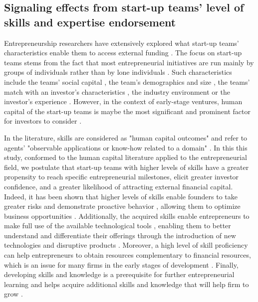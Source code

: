 \documentclass[12pt]{article}
\begin{document}
\subsection{Signaling effects from start-up teams' level of skills and expertise endorsement}

Entrepreneurship researchers have extensively explored what start-up teams' characteristics enable them to access external funding \citep{roure1990predictors}. The focus on start-up teams stems from the fact that most entrepreneurial initiatives are run mainly by groups of individuals rather than by lone individuals \citep{klotz2014new}. Such characteristics include the teams' social capital \citep{shane2002network}, the team's demographics and size \citep{eisenhardt1990organizational}, the teams' match with an investor's characteristics \citep{aggarwal2015evaluating}, the industry environment \citep{townsend2015turning} or the investor's experience \citep{franke2008venture}. However, in the context of early-stage ventures, human capital of the start-up teams is maybe the most significant and prominent factor for investors to consider \citep{beckman2007early, ko2018signaling, matusik2008values}.

In the literature, skills are considered as "human capital outcomes" and refer to agents’ "observable applications or know-how related to a domain" \citep{becker1964human, marvel2016human}. In this this study, conformed to the human capital literature applied to the entrepreneurial field, we postulate that start-up teams with higher levels of skills have a greater propensity to reach specific entrepreneurial milestones, elicit greater investor confidence, and a greater likelihood of attracting external financial capital. Indeed, it has been shown that higher levels of skills enable founders to take greater risks and demonstrate proactive behavior \citep{becherer1999proactive}, allowing them to optimize business opportunities \citep{shane2000promise, chandler1994founder}. Additionally, the acquired skills enable entrepreneurs to make full use of the available technological tools \citep{nambisan2017digital}, enabling them to better understand and differentiate their offerings through the introduction of new technologies and disruptive products \citep{marvel2007technology}. Moreover, a high level of skill proficiency can help entrepreneurs to obtain resources complementary to financial resources, which is an issue for many firms in the early stages of development \citep{beckman2007early}. Finally, developing skills and knowledge is a prerequisite for further entrepreneurial learning and helps acquire additional skills and knowledge that will help firm to grow \citep{hunter1986cognitive}.
\end{document}
